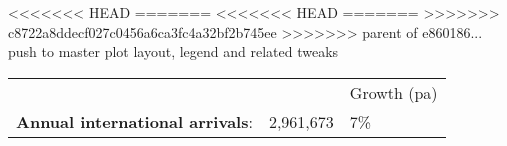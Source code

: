 <<<<<<< HEAD
=======
<<<<<<< HEAD
=======
>>>>>>> c8722a8ddecf027c0456a6ca3fc4a32bf2b745ee
>>>>>>> parent of e860186... push to master plot layout, legend and related tweaks
\begin{tabular}[t]{p{4.8cm}>{\hfill}p{1.3cm}>{\hfill}p{1.4cm}}
   &   & Growth (pa) \\ 
 \textbf{Annual international arrivals}: & 2,961,673 & 7\% \\ 
  \end{tabular}
